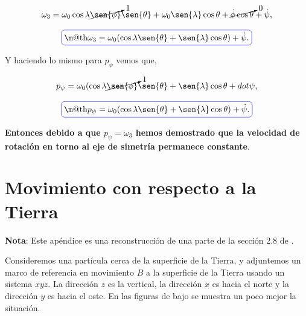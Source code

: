 \documentclass[a4paper,10pt]{article}
\makeatletter
\numberwithin{equation}{section}
\newcommand*{\boxcolor}{blue}
\renewcommand{\boxed}[1]{\textcolor{\boxcolor}{%
\tikz[baseline={([yshift=-1ex]current bounding box.center)}] \node [rectangle, minimum width=1ex,rounded corners,draw] {\normalcolor\m@th$\displaystyle#1$};}}
\makeatother
\begin{document}
\begin{equation}
 \omega_3 = \omega_0\cos{\lambda}\cancelto{1}{\sen{\phi}}\sen{\theta} + \omega_0\sen{\lambda}\cos{\theta} + 
 \cancelto{0}{\dot{\phi}\cos{\theta}} + \dot{\psi},
\end{equation}

\begin{equation}
 \boxed{\omega_3 = \omega_0(\cos{\lambda}\sen{\theta} + \sen{\lambda}\cos{\theta}) + \dot{\psi}.}
\end{equation}

Y haciendo lo mismo para $p_\psi$ vemos que,

\begin{equation}
 p_\psi = \omega_0(\cos{\lambda}\cancelto{1}{\sen{\phi}}\sen{\theta}+ 
 \sen{\lambda}\cos{\theta} + dot{\psi},
\end{equation}

\begin{equation}
 \boxed{p_\psi = \omega_0(\cos{\lambda}\sen{\theta} + \sen{\lambda}\cos{\theta}) + \dot{\psi}.}
\end{equation}

\textbf{Entonces debido a que $p_\psi = \omega_3$ hemos demostrado que la velocidad de rotación 
en torno al eje de simetría permanece constante}.







\appendix
\appendixpage

\section{Movimiento con respecto a la Tierra} \label{app:apendice1}

\textbf{Nota}: Este apéndice es una reconstrucción de una parte de la sección 2.8 
de \cite{baruh}. 

\vspace{.3cm}

Consideremos una partícula cerca de la superficie de la Tierra, y adjuntemos un marco 
de referencia en movimiento $B$ a la superficie de la Tierra usando un sistema 
$xyz$. La dirección $z$ es la vertical, la dirección $x$ es hacia el norte y la 
dirección $y$ es hacia el oste. En las figuras de bajo se muestra un poco mejor 
la situación.
\end{document}
